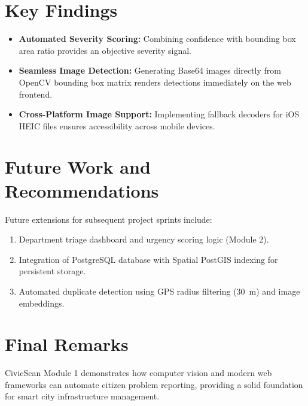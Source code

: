 \documentclass{tietreport}
\begin{document}
\section{Key Findings}

\begin{itemize}
  \item \textbf{Automated Severity Scoring:} Combining confidence with bounding box area ratio provides an objective severity signal.
  \item \textbf{Seamless Image Detection:} Generating Base64 images directly from OpenCV bounding box matrix renders detections immediately on the web frontend.
  \item \textbf{Cross-Platform Image Support:} Implementing fallback decoders for iOS HEIC files ensures accessibility across mobile devices.
\end{itemize}

\section{Future Work and Recommendations}

Future extensions for subsequent project sprints include:
\begin{enumerate}
  \item Department triage dashboard and urgency scoring logic (Module 2).
  \item Integration of PostgreSQL database with Spatial PostGIS indexing for persistent storage.
  \item Automated duplicate detection using GPS radius filtering (30~m) and image embeddings.
\end{enumerate}

\section{Final Remarks}

CivicScan Module 1 demonstrates how computer vision and modern web frameworks can automate citizen problem reporting, providing a solid foundation for smart city infrastructure management.


\printbibliography[heading=bibintoc]
\end{document}
